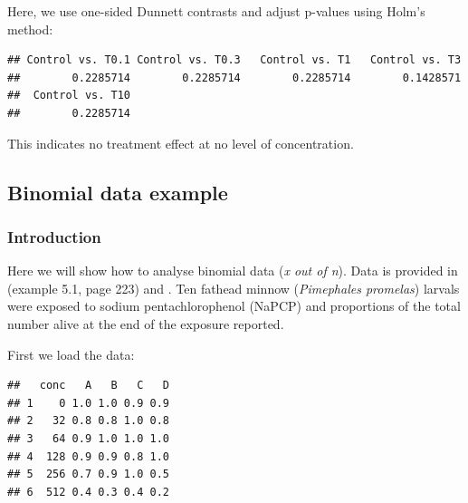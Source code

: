 Here, we use one-sided Dunnett contrasts and adjust p-values using Holm's method:
\begin{knitrout}
\color{fgcolor}\begin{kframe}
\begin{alltt}
\hlstd{(} \hlopt{$}  \hlopt{$}
                 \hlstd{=} \hlstd{,}  \hlstd{=} \hlstd{,}  \hlstd{=} \hlstd{)}
\end{alltt}
\begin{verbatim}
## Control vs. T0.1 Control vs. T0.3   Control vs. T1   Control vs. T3 
##        0.2285714        0.2285714        0.2285714        0.1428571 
##  Control vs. T10 
##        0.2285714
\end{verbatim}
\end{kframe}
\end{knitrout}
This indicates no treatment effect at no level of concentration.




\subsection{Binomial data example}
\subsubsection{Introduction}
Here we will show how to analyse binomial data (\emph{x out of n}). 
Data is provided in \citet{newman_quantitative_2012} (example 5.1, page 223) and \citet{epa_methods_2002}.
Ten fathead minnow (\textit{Pimephales promelas}) larvals were exposed to sodium pentachlorophenol (NaPCP) and proportions of the total number alive at the end of the exposure reported.

First we load the data:
\begin{knitrout}
\color{fgcolor}\begin{kframe}
\begin{alltt}
 \hlkwb{<-} \hlstd{(} \hlstd{=} \hlstd{,}  \hlstd{=} \hlstd{)}
\end{alltt}
\begin{verbatim}
##   conc   A   B   C   D
## 1    0 1.0 1.0 0.9 0.9
## 2   32 0.8 0.8 1.0 0.8
## 3   64 0.9 1.0 1.0 1.0
## 4  128 0.9 0.9 0.8 1.0
## 5  256 0.7 0.9 1.0 0.5
## 6  512 0.4 0.3 0.4 0.2
\end{verbatim}
\end{kframe}
\end{knitrout}


